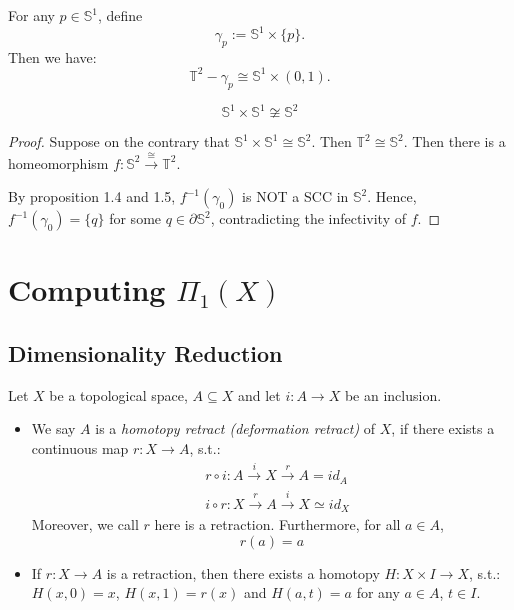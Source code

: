 \begin{proposition}
    For any $p\in \mathbb{S}^1$, define 
    $$\gamma_p := \mathbb{S}^1 \times \{ p\}.$$
    Then we have:
    $$\mathbb{T}^2 - \gamma_p \cong \mathbb{S}^1 \times (0,1).$$
\end{proposition}

\begin{proposition}
    $$\mathbb{S}^1 \times \mathbb{S}^1 \not\cong \mathbb{S}^2$$
\end{proposition}

\begin{proof}
    Suppose on the contrary that $\mathbb{S}^1 \times \mathbb{S}^1 \cong \mathbb{S}^2$. Then $\mathbb{T}^2 \cong \mathbb{S}^2$. Then there is a homeomorphism $f:\mathbb{S}^2 \overset{\cong}{\rightarrow} \mathbb{T}^2$.

    By proposition 1.4 and 1.5, $f^{-1}(\gamma_0)$ is NOT a SCC in $\mathbb{S}^2$. Hence, $f^{-1}(\gamma_0) = \{ q\}$ for some $q \in \partial \mathbb{S}^2$, contradicting the infectivity of $f$.
\end{proof}

\section{Computing $\Pi_1 (X)$}

\subsection{Dimensionality Reduction}

\begin{definition}
    Let $X$ be a topological space, $A \subseteq X$ and let $i: A \to X$ be an inclusion. 
    \begin{itemize}
        \item We say $A$ is a \textit{homotopy retract (deformation retract)} of $X$, if there exists a continuous map $r: X \rightarrow A$, s.t.:
        \begin{align*}
            &r \circ i: A \overset{i}{\rightarrow} X \overset{r}{\rightarrow} A = id_A\\
            &i \circ r : X \overset{r}{\rightarrow} A \overset{i}{\rightarrow} X \simeq id_X
        \end{align*}
        Moreover, we call $r$ here is a retraction. Furthermore, for all $a \in A$, $$r(a) = a$$
        \item If $r: X \to A$ is a retraction, then there exists a homotopy $H : X \times I \to X$, s.t.: $H(x,0) =x$, $H(x,1)=r(x)$ and $H(a,t) = a$ for any $a \in A$, $t\in I$.
    \end{itemize}
\end{definition}

